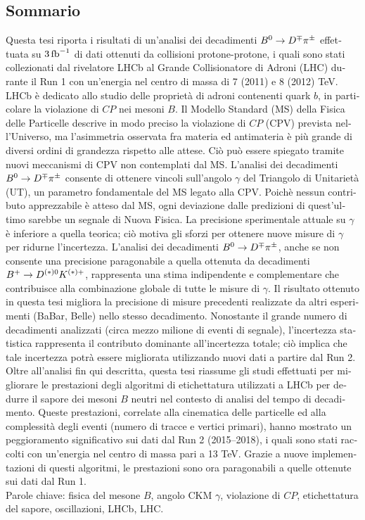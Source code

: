 \begin{otherlanguage}{italian}
\cleardoublepage
\chapter*{Sommario}
\vskip0.2cm
Questa tesi riporta i risultati di un'analisi dei decadimenti $B^0\rightarrow D^\mp\pi^\pm$ effettuata su $3 \mbox{\,fb}^{-1}$ di
dati ottenuti da collisioni protone-protone, i quali sono stati collezionati dal rivelatore LHCb al Grande Collisionatore di Adroni (LHC) durante il Run 1
con un'energia nel centro di massa di 7 (2011) e 8 (2012) TeV. LHCb è dedicato allo studio delle proprietà di adroni
contenenti quark $b$, in particolare la violazione di $CP$ nei mesoni $B$.
Il Modello Standard (MS) della Fisica delle Particelle descrive in modo preciso la 
violazione di $CP$ (CPV) prevista nell'Universo, ma l'asimmetria osservata fra materia ed antimateria è più
grande di diversi ordini di grandezza rispetto alle attese. Ciò può essere spiegato tramite nuovi meccanismi di
CPV non contemplati dal MS. 
L'analisi dei decadimenti $B^0\rightarrow D^\mp\pi^\pm$ consente di ottenere vincoli sull'angolo $\gamma$ del Triangolo di Unitarietà (UT),
un parametro fondamentale del MS legato alla CPV. Poichè nessun contributo apprezzabile è atteso dal MS, ogni
deviazione dalle predizioni di quest'ultimo sarebbe un segnale di Nuova Fisica.
La precisione sperimentale attuale su $\gamma$ è inferiore a quella teorica; ciò motiva gli sforzi per ottenere nuove misure di
$\gamma$ per ridurne l'incertezza. L'analisi dei decadimenti $B^0\rightarrow D^\mp\pi^\pm$, anche se non consente una precisione
paragonabile a quella ottenuta da decadimenti $B^+\rightarrow D^{(*)0}K^{(*)+}$, rappresenta una stima indipendente e
complementare che contribuisce alla combinazione globale di tutte le misure di $\gamma$.
Il risultato ottenuto in questa tesi migliora la precisione di misure precedenti realizzate da altri esperimenti (BaBar, Belle)
nello stesso decadimento.
Nonostante il grande numero di decadimenti analizzati (circa mezzo milione di eventi di segnale), l'incertezza statistica
rappresenta il contributo dominante all'incertezza totale; ciò implica che tale incertezza potrà essere migliorata
utilizzando nuovi dati a partire dal Run 2. \\ 
Oltre all'analisi fin qui descritta, questa tesi riassume gli studi effettuati per migliorare le prestazioni degli
algoritmi di etichettatura utilizzati a LHCb per dedurre il sapore dei mesoni $B$ neutri
nel contesto di analisi del tempo di decadimento. 
Queste prestazioni, correlate alla cinematica delle particelle ed alla complessità
degli eventi (numero di tracce e vertici primari), hanno mostrato un peggioramento significativo
sui dati dal Run 2 (2015--2018), i quali sono stati raccolti con un'energia nel centro di massa pari a 13 TeV.
Grazie a nuove implementazioni di questi algoritmi, le prestazioni sono ora paragonabili a quelle ottenute
sui dati dal Run 1. \\

Parole chiave: fisica del mesone $B$, angolo CKM $\gamma$, violazione di $CP$, etichettatura del sapore, oscillazioni, LHCb, LHC.


\end{otherlanguage}


